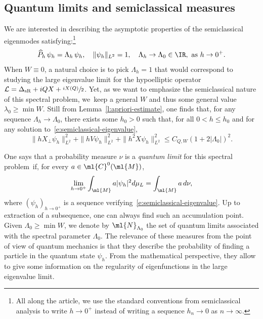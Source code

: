 \documentclass[JEP,XML,SOM,Unicode, NoEqCountersInSection,published]{cedram}
\theoremstyle{plain}
\theoremstyle{definition}
\theoremstyle{remark}
\begin{document}
\subsection{Quantum limits and semiclassical measures}
We are interested in describing the asymptotic properties of the semiclassical eigenmodes satisfying:\footnote{All along the article, we use the standard conventions from semiclassical analysis to write $h\to 0^+$ instead of writing a sequence $h_n\to 0$ as $n\to\infty.$}
\begin{equation}\label{e:semiclassical-eigenvalue}
\widehat{P}_h \, \psi_h =\Lambda_h \, \psi_h,\quad\|\psi_h\|_{L^2}=1,\quad\Lambda_h\to\Lambda_0\in\IR,\ \text{as}\ h\to 0^+.
\end{equation}
When $W\equiv 0$, a natural choice is to pick $\Lambda_h=1$ that would correspond to studying the large eigenvalue limit for the hypoelliptic operator
$\mathcal{L}=\Delta_{\text{sR}}+iQX +\sfrac{iX(Q)}{2}$. Yet, as we want to emphasize the semiclassical nature of this spectral problem, we~keep a general $W$ and thus some general value $\lambda_0\geq\min W$. Still from Lemma~\ref{l:apriori-estimate}, one finds that, for any sequence $\Lambda_h\to \Lambda_0$, there exists some $h_0>0$ such that, for all $0<h\leq h_0$ and for any solution to~\eqref{e:semiclassical-eigenvalue},
\begin{equation}\label{e:apriori-semiclassical}
\|hX_\perp\psi_h\|_{L^2}^2+\|hV\psi_h\|_{L^2}^2+\|h^2X\psi_h\|_{L^2}^2\leq C_{Q,W}(1+2|\Lambda_0|)^2.
\end{equation}

One says that a probability measure $\nu$ is a \emph{quantum limit} for this spectral problem~if, for every $a\in\ml{C}^0(\ml{M})$,
\[
\lim_{h\to 0^+}\int_{\ml{M}}a|\psi_h|^2d\mu_L=\int_{\ml{M}}a \, d\nu,
\]
where $(\psi_h)_{h\to 0^+}$ is a sequence verifying~\eqref{e:semiclassical-eigenvalue}. Up to extraction of a subsequence, one can always find such an accumulation point. Given $\Lambda_0\geq\min W$, we denote by $\ml{N}_{\Lambda_0}$ the set of quantum limits associated with the spectral parameter $\Lambda_0$. The relevance of these measures from the point of view of quantum mechanics is that they describe the probability of finding a particle in the quantum state $\psi_h$. From the mathematical perspective, they allow to give some information on the regularity of eigenfunctions in the large eigenvalue limit.
\end{document}
